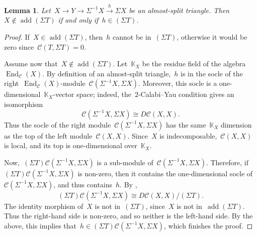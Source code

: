 \documentclass{amsart}
\newtheorem{lemma}[theorem]{Lemma}
\theoremstyle{definition}
\newcommand{\field}{\mathbb{K}}
\newcommand{\cat}{\mathcal{C}}
\newcommand{\susp}{\Sigma}
\newcommand{\add}{\operatorname{add}}
\newcommand{\End}[1]{\operatorname{End}_{#1}}
\begin{document}
\begin{lemma}\label{lemm::almost-split}
 Let~$X\xrightarrow{} Y \xrightarrow{} \susp^{-1} X \xrightarrow{h} \susp X$ be an almost-split triangle.  Then~$X\notin \add(\susp T)$ if and only if~$h\in (\susp T)$.
\end{lemma}
\begin{proof}
 If~$X\in \add(\susp T)$, then~$h$ cannot be in~$(\susp T)$, otherwise it would be zero since~$\cat(T, \susp T) =0$.  
 
 Assume now that~$X\notin \add(\susp T)$.  Let~$\field_X$ be the residue field of the algebra~$\End{\cat}(X)$. 
 By definition of an almost-split triangle,~$h$ is in the socle of the right~$\End{\cat}(X)$-module~$\cat(\susp^{-1} X, \susp X)$.  Moreover, this socle is a one-dimensional~$\field_X$-vector space; indeed, the~$2$-Calabi--Yau condition gives an isomorphism
 \[
  \cat(\susp^{-1} X, \susp X) \cong D\cat(X, X).
 \]
 Thus the socle of the right module~$\cat(\susp^{-1} X, \susp X)$ has the same~$\field_X$ dimension as the top of the left module~$\cat(X,X)$.  Since~$X$ is indecomposable,~$\cat(X,X)$ is local, and its top is one-dimensional over~$\field_X$.
 
 Now,~$(\susp T)\cat(\susp^{-1} X, \susp X)$ is a sub-module of~$\cat(\susp^{-1} X, \susp X)$.  Therefore, if~$(\susp T)\cat(\susp^{-1} X, \susp X)$ is non-zero, then it contains the one-dimensional socle of~$\cat(\susp^{-1} X, \susp X)$, and thus contains~$h$.   
 By \cite{Palu},
 \[
  (\susp T)\cat(\susp^{-1} X, \susp X) \cong D\cat(X, X)/(\susp T). 
 \]
The identity morphism of~$X$ is not in~$(\susp T)$, since~$X$ is not in~$\add(\susp T)$.  Thus the right-hand side is non-zero, and so neither is the left-hand side.  By the above, this implies that~$h\in (\susp T)\cat(\susp^{-1} X, \susp X)$, which finishes the proof.
\end{proof}
\end{document}
